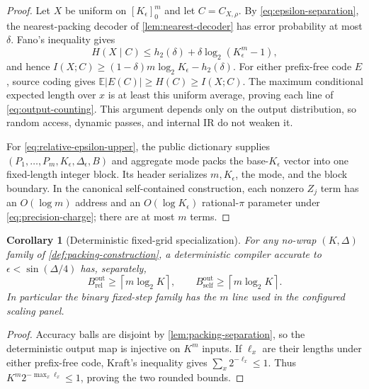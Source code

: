 \documentclass[aps,prx,reprint,floatfix,superscriptaddress]{revtex4-2}
\newtheorem{corollary}{Corollary}
\begin{document}
\begin{proof}
Let $X$ be uniform on $[K_\epsilon]_0^m$ and let $C=C_{X,\rho}$.
By \eqref{eq:epsilon-separation}, the nearest-packing decoder of
\cref{lem:nearest-decoder} has error probability at most $\delta$.  Fano's
inequality gives
\begin{equation*}
 H(X\mid C)\leq h_2(\delta)
       +\delta\log_2(K_\epsilon^m-1),
\end{equation*}
and hence
$I(X;C)\geq(1-\delta)m\log_2K_\epsilon-h_2(\delta)$.
For either prefix-free code $E$, source coding gives
$\mathbb E|E(C)|\geq H(C)\geq I(X;C)$.  The maximum conditional expected
length over $x$ is at least this uniform average, proving each line of
\eqref{eq:output-counting}.  This argument depends only on the output
distribution, so random access, dynamic passes, and internal IR do not
weaken it.

For \eqref{eq:relative-epsilon-upper}, the public dictionary supplies
$(P_1,\ldots,P_m,K_\epsilon,\Delta_\epsilon,B)$ and aggregate mode packs
the base-$K_\epsilon$ vector into one fixed-length integer block.  Its
header serializes $m,K_\epsilon$, the mode, and the block boundary.  In the
canonical self-contained construction, each nonzero $Z_j$ term has an
$O(\log m)$ address and an $O(\log K_\epsilon)$ rational-$\pi$ parameter
under \eqref{eq:precision-charge}; there are at most $m$ terms.
\end{proof}

\begin{corollary}[Deterministic fixed-grid specialization]
\label{cor:fixed-grid-output}
For any no-wrap $(K,\Delta)$ family of
\cref{def:packing-construction}, a deterministic compiler accurate to
$\epsilon<\sin(\Delta/4)$ has, separately,
\begin{equation*}
 B_{\mathrm{rel}}^{\mathrm{out}}\geq\left\lceil m\log_2K\right\rceil,
 \qquad
 B_{\mathrm{self}}^{\mathrm{out}}\geq\left\lceil m\log_2K\right\rceil.
\end{equation*}
In particular the binary fixed-step family has the $m$ line used in the
configured scaling panel.
\end{corollary}

\begin{proof}
Accuracy balls are disjoint by \cref{lem:packing-separation}, so the
deterministic output map is injective on $K^m$ inputs.  If $\ell_x$ are
their lengths under either prefix-free code, Kraft's inequality gives
$\sum_x2^{-\ell_x}\leq1$.  Thus
$K^m2^{-\max_x\ell_x}\leq1$, proving the two rounded bounds.
\end{proof}
\end{document}
